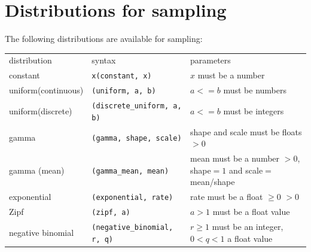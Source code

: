\documentclass[hidelinks,11pt]{article}
\newcommand{\sq}{\textquotesingle}
\begin{document}
\section{Distributions for sampling}\label{apx:sampling}

The following distributions are available for sampling:

{\small\centering
  \begin{longtable}{ p{3cm} p{5cm} p{5.5cm}}
    distribution & syntax & parameters\\
    constant & \texttt{x}\newline \texttt{(\sq constant\sq, x)}
    & $x$ must
    be a number\\
    uniform\newline (continuous) & \texttt{(\sq uniform\sq, a, b)} & $a<=b$
    must be numbers\\
    uniform\newline (discrete) & \texttt{(\sq discrete\_uniform\sq, a, b)} &
    $a<=b$ must be integers\\
    gamma & \texttt{(\sq gamma\sq, shape, scale)} & shape and scale must be
    floats $>0$\\
    gamma (mean) & \texttt{(\sq gamma\_mean\sq, mean)} & mean must be a number
    $>0$, shape$=1$ and scale$=$mean/shape\\
    exponential & \texttt{(\sq exponential\sq, rate)} & rate must be a float
    $\ge0$ $>0$\\
    Zipf & \texttt{(\sq zipf\sq, a)} & $a>1$ must be a float value\\
    negative binomial & \texttt{(\sq negative\_binomial\sq, r, q)} & $r\ge 1$
    must be an integer, \newline $0<q<1$ a float value\\
  \end{longtable}
}
\end{document}
